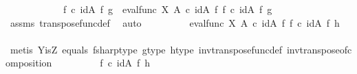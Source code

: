 \begin{isabellebody}
\ \ \ \isamarkupfalse%
\ {\isacharminus}{\kern0pt}\ \isanewline
\ \ \ \ \isamarkupfalse%
\ {\isachardoublequoteopen}f\ {\isasymcirc}\isactrlsub c\ {\isacharparenleft}{\kern0pt}id{\isacharparenleft}{\kern0pt}A{\isacharparenright}{\kern0pt}\ {\isasymtimes}\isactrlsub f\ g{\isacharparenright}{\kern0pt}\ {\isacharequal}{\kern0pt}\ {\isacharparenleft}{\kern0pt}eval{\isacharunderscore}{\kern0pt}func\ X\ A\ {\isasymcirc}\isactrlsub c\ {\isacharparenleft}{\kern0pt}id{\isacharparenleft}{\kern0pt}A{\isacharparenright}{\kern0pt}\ {\isasymtimes}\isactrlsub f\ f\isactrlsup {\isasymsharp}{\isacharparenright}{\kern0pt}{\isacharparenright}{\kern0pt}\ {\isasymcirc}\isactrlsub c\ {\isacharparenleft}{\kern0pt}id{\isacharparenleft}{\kern0pt}A{\isacharparenright}{\kern0pt}\ {\isasymtimes}\isactrlsub f\ g{\isacharparenright}{\kern0pt}{\isachardoublequoteclose}\isanewline
\ \ \ \ \ \ \isamarkupfalse%
\ assms{\isacharparenleft}{\kern0pt}{}{\isacharparenright}{\kern0pt}\ transpose{\isacharunderscore}{\kern0pt}func{\isacharunderscore}{\kern0pt}def\ \isamarkupfalse%
\ auto\isanewline
\ \ \ \ \isamarkupfalse%
\ \isamarkupfalse%
\ {\isachardoublequoteopen}{\isachardot}{\kern0pt}{\isachardot}{\kern0pt}{\isachardot}{\kern0pt}\ {\isacharequal}{\kern0pt}\ {\isacharparenleft}{\kern0pt}eval{\isacharunderscore}{\kern0pt}func\ X\ A\ {\isasymcirc}\isactrlsub c\ {\isacharparenleft}{\kern0pt}id{\isacharparenleft}{\kern0pt}A{\isacharparenright}{\kern0pt}\ {\isasymtimes}\isactrlsub f\ f\isactrlsup {\isasymsharp}{\isacharparenright}{\kern0pt}{\isacharparenright}{\kern0pt}\ {\isasymcirc}\isactrlsub c\ {\isacharparenleft}{\kern0pt}id{\isacharparenleft}{\kern0pt}A{\isacharparenright}{\kern0pt}\ {\isasymtimes}\isactrlsub f\ h{\isacharparenright}{\kern0pt}{\isachardoublequoteclose}\isanewline
\ \ \ \ \ \ \isamarkupfalse%
\ {\isacharparenleft}{\kern0pt}metis\ Y{\isacharunderscore}{\kern0pt}is{\isacharunderscore}{\kern0pt}Z\ equals\ f{\isacharunderscore}{\kern0pt}sharp{\isacharunderscore}{\kern0pt}type{}\ g{\isacharunderscore}{\kern0pt}type\ h{\isacharunderscore}{\kern0pt}type\ inv{\isacharunderscore}{\kern0pt}transpose{\isacharunderscore}{\kern0pt}func{\isacharunderscore}{\kern0pt}def{}\ inv{\isacharunderscore}{\kern0pt}transpose{\isacharunderscore}{\kern0pt}of{\isacharunderscore}{\kern0pt}composition{\isacharparenright}{\kern0pt}\isanewline
\ \ \ \ \isamarkupfalse%
\ \isamarkupfalse%
\ {\isachardoublequoteopen}{\isachardot}{\kern0pt}{\isachardot}{\kern0pt}{\isachardot}{\kern0pt}\ {\isacharequal}{\kern0pt}\ f\ {\isasymcirc}\isactrlsub c\ {\isacharparenleft}{\kern0pt}id{\isacharparenleft}{\kern0pt}A{\isacharparenright}{\kern0pt}\ {\isasymtimes}\isactrlsub f\ h{\isacharparenright}{\kern0pt}{\isachardoublequoteclose}\isanewline

\end{isabellebody}
